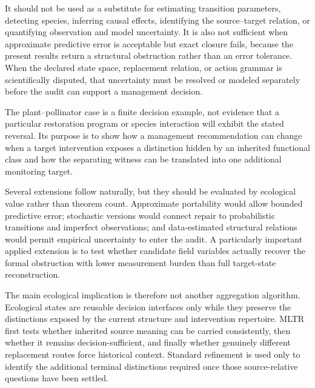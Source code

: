 \documentclass[11pt]{article}
\begin{document}
It should not be used as a substitute for estimating transition parameters, detecting species, inferring causal effects, identifying the source--target relation, or quantifying observation and model uncertainty. It is also not sufficient when approximate predictive error is acceptable but exact closure fails, because the present results return a structural obstruction rather than an error tolerance. When the declared state space, replacement relation, or action grammar is scientifically disputed, that uncertainty must be resolved or modeled separately before the audit can support a management decision.

The plant--pollinator case is a finite decision example, not evidence that a particular restoration program or species interaction will exhibit the stated reversal. Its purpose is to show how a management recommendation can change when a target intervention exposes a distinction hidden by an inherited functional class and how the separating witness can be translated into one additional monitoring target.

Several extensions follow naturally, but they should be evaluated by ecological value rather than theorem count. Approximate portability would allow bounded predictive error; stochastic versions would connect repair to probabilistic transitions and imperfect observations; and data-estimated structural relations would permit empirical uncertainty to enter the audit. A particularly important applied extension is to test whether candidate field variables actually recover the formal obstruction with lower measurement burden than full target-state reconstruction.

The main ecological implication is therefore not another aggregation algorithm. Ecological states are reusable decision interfaces only while they preserve the distinctions exposed by the current structure and intervention repertoire. MLTR first tests whether inherited source meaning can be carried consistently, then whether it remains decision-sufficient, and finally whether genuinely different replacement routes force historical context. Standard refinement is used only to identify the additional terminal distinctions required once those source-relative questions have been settled.
\end{document}
